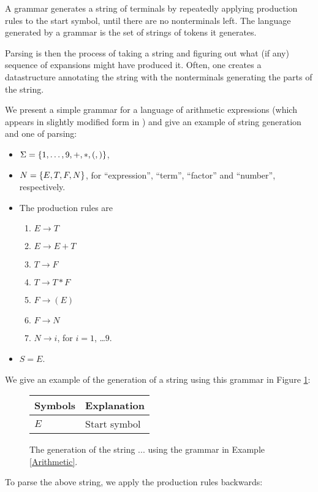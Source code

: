 A grammar generates a string of terminals by repeatedly applying production rules to the start symbol, until there are no nonterminals left.
The language generated by a grammar is the set of strings of tokens it generates.

Parsing is then the process of taking a string and figuring out what (if any) sequence of expansions might have produced it. Often, one creates a datastructure annotating the string with the nonterminals generating the parts of the string.
\begin{Example}
  \label{Arithmetic}
  We present a simple grammar for a language of arithmetic expressions (which appears in slightly modified form in \cite{Lange-Leiss}) and give an example of string generation and one of parsing:
  \begin{itemize}
  \item $\Sigma = \{1,\ldots , 9, +, *, (, )\}$,
  \item $N = \{E, T, F, N\}$, for ``expression'', ``term'', ``factor'' and ``number'', respectively.
  \item The production rules are
    \begin{enumerate}
    \item \label{p1} $E \to T$
    \item \label{p2} $E \to E + T$
    \item \label{p3} $T \to F$
    \item \label{p4} $T \to T * F$ 
    \item \label{p5} $F \to ( E )$
    \item \label{p6} $F \to N$
    \item \label{p7} $N \to i$, for $i = 1$, \ldots $9$. 
    \end{enumerate}
  \item $S = E$.
  \end{itemize}
  We give an example of the generation of a string using this grammar in Figure \ref{Str-Gen}: 
  \begin{figure}
    \centering
    \begin{tabular}{l||l}
      Symbols & Explanation \\\hline
      $E$ & Start symbol
    \end{tabular}
    \caption{The generation of the string $...$ using the grammar in Example \ref{Arithmetic}.\label{Str-Gen}}
  \end{figure}
  
  To parse the above string, we apply the production rules backwards: 
  
\end{Example}
